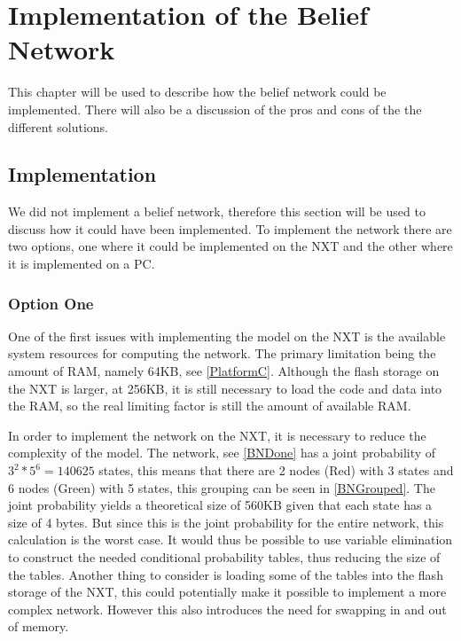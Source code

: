 \chapter{Implementation of the Belief Network}
This chapter will be used to describe how the belief network could be
implemented. There will also be a discussion of the pros and cons of the
the different solutions.

\section{Implementation}
We did not implement a belief network, therefore this section will be used to
discuss how it could have been implemented. To implement the network there are
two options, one where it could be implemented on the NXT and the other where it is
implemented on a PC.

%

\subsection{Option One}
One of the first issues with implementing the model on the NXT is the available
system resources for computing the network. The primary limitation being the
amount of RAM, namely 64KB, see \autoref{PlatformC}. Although the flash storage
on the NXT is larger, at 256KB, it is still necessary to load the code and data
into the RAM, so the real limiting factor is still the amount of available
RAM.\nl

In order to implement the network on the NXT, it is necessary to reduce
the complexity of the model. The network, see \autoref{BNDone} has a joint
probability of $3^2*5^6 = 140625$ states, this means that there are 2 nodes (Red)
with 3 states and 6 nodes (Green) with 5 states, this grouping can be seen in
\autoref{BNGrouped}. The joint probability yields a theoretical size of 560KB given that each state has a size of 4 bytes. But since this is the joint
probability for the entire network, this calculation is the worst case. It
would thus be possible to use variable elimination to construct the needed
conditional probability tables, thus reducing the size of the tables. Another
thing to consider is loading some of the tables into the flash storage of the NXT, this could potentially make it possible to implement a more
complex network. However this also introduces the need for swapping in and out
of memory.\nl

